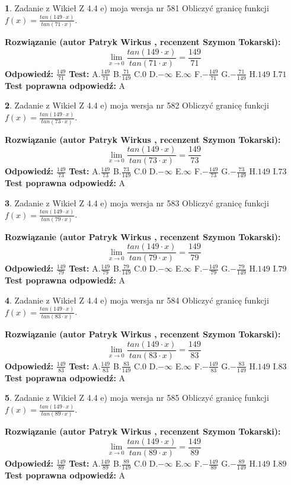 \documentclass[12pt, a4paper]{article}
\theoremstyle{definition} %
\newtheorem{zad}{}
\newcommand{\zadStart}[1]{\begin{zad}#1\newline}
\newcommand{\zadStop}{\end{zad}}
\newcommand{\rozwStart}[2]{\noindent \textbf{Rozwiązanie (autor #1 , recenzent #2): }\newline}
\newcommand{\rozwStop}{\newline}
\newcommand{\odpStart}{\noindent \textbf{Odpowiedź:}\newline}
\newcommand{\odpStop}{\newline}
\newcommand{\testStart}{\noindent \textbf{Test:}\newline}
\newcommand{\testStop}{\newline}
\newcommand{\kluczStart}{\noindent \textbf{Test poprawna odpowiedź:}\newline}
\newcommand{\kluczStop}{\newline}
\begin{document}
\zadStart{Zadanie z Wikieł Z 4.4 e) moja wersja nr 581}
Obliczyć granicę funkcji $f(x)=\frac{tan(149\cdot x)}{tan(71\cdot x)}$.
\zadStop
\rozwStart{Patryk Wirkus}{Szymon Tokarski}
$$\lim\limits_{x\to 0}\frac{tan(149\cdot x)}{tan(71\cdot x)}=
\frac{149}{71}$$
\rozwStop
\odpStart
$\frac{149}{71}$
\odpStop
\testStart
A.$\frac{149}{71}$
B.$\frac{71}{149}$
C.$0$
D.$-\infty$
E.$\infty$
F.$-\frac{149}{71}$
G.$-\frac{71}{149}$
H.$149$
I.$71$
\testStop
\kluczStart
A
\kluczStop



\zadStart{Zadanie z Wikieł Z 4.4 e) moja wersja nr 582}
Obliczyć granicę funkcji $f(x)=\frac{tan(149\cdot x)}{tan(73\cdot x)}$.
\zadStop
\rozwStart{Patryk Wirkus}{Szymon Tokarski}
$$\lim\limits_{x\to 0}\frac{tan(149\cdot x)}{tan(73\cdot x)}=
\frac{149}{73}$$
\rozwStop
\odpStart
$\frac{149}{73}$
\odpStop
\testStart
A.$\frac{149}{73}$
B.$\frac{73}{149}$
C.$0$
D.$-\infty$
E.$\infty$
F.$-\frac{149}{73}$
G.$-\frac{73}{149}$
H.$149$
I.$73$
\testStop
\kluczStart
A
\kluczStop



\zadStart{Zadanie z Wikieł Z 4.4 e) moja wersja nr 583}
Obliczyć granicę funkcji $f(x)=\frac{tan(149\cdot x)}{tan(79\cdot x)}$.
\zadStop
\rozwStart{Patryk Wirkus}{Szymon Tokarski}
$$\lim\limits_{x\to 0}\frac{tan(149\cdot x)}{tan(79\cdot x)}=
\frac{149}{79}$$
\rozwStop
\odpStart
$\frac{149}{79}$
\odpStop
\testStart
A.$\frac{149}{79}$
B.$\frac{79}{149}$
C.$0$
D.$-\infty$
E.$\infty$
F.$-\frac{149}{79}$
G.$-\frac{79}{149}$
H.$149$
I.$79$
\testStop
\kluczStart
A
\kluczStop



\zadStart{Zadanie z Wikieł Z 4.4 e) moja wersja nr 584}
Obliczyć granicę funkcji $f(x)=\frac{tan(149\cdot x)}{tan(83\cdot x)}$.
\zadStop
\rozwStart{Patryk Wirkus}{Szymon Tokarski}
$$\lim\limits_{x\to 0}\frac{tan(149\cdot x)}{tan(83\cdot x)}=
\frac{149}{83}$$
\rozwStop
\odpStart
$\frac{149}{83}$
\odpStop
\testStart
A.$\frac{149}{83}$
B.$\frac{83}{149}$
C.$0$
D.$-\infty$
E.$\infty$
F.$-\frac{149}{83}$
G.$-\frac{83}{149}$
H.$149$
I.$83$
\testStop
\kluczStart
A
\kluczStop



\zadStart{Zadanie z Wikieł Z 4.4 e) moja wersja nr 585}
Obliczyć granicę funkcji $f(x)=\frac{tan(149\cdot x)}{tan(89\cdot x)}$.
\zadStop
\rozwStart{Patryk Wirkus}{Szymon Tokarski}
$$\lim\limits_{x\to 0}\frac{tan(149\cdot x)}{tan(89\cdot x)}=
\frac{149}{89}$$
\rozwStop
\odpStart
$\frac{149}{89}$
\odpStop
\testStart
A.$\frac{149}{89}$
B.$\frac{89}{149}$
C.$0$
D.$-\infty$
E.$\infty$
F.$-\frac{149}{89}$
G.$-\frac{89}{149}$
H.$149$
I.$89$
\testStop
\kluczStart
A
\kluczStop
\end{document}
